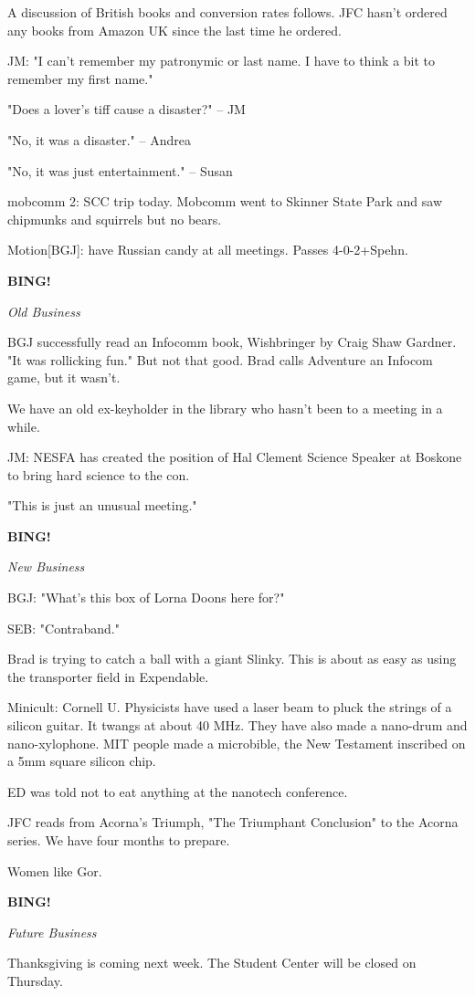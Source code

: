 \documentclass[12pt]{article}
\newcommand{\bing}{{\bf BING!} }
\newcommand{\goto}[1]{\bing \vskip 12pt \centerline{{\em{#1}}}}
\begin{document}
A discussion of British books and conversion rates follows. JFC hasn't ordered any books from Amazon UK since the last time he ordered.

JM: "I can't remember my patronymic or last name. I have to think a bit to remember my first name."

"Does a lover's tiff cause a disaster?" -- JM

"No, it was a disaster." -- Andrea

"No, it was just entertainment." -- Susan

mobcomm 2: SCC trip today. Mobcomm went to Skinner State Park and saw chipmunks and squirrels but no bears.

Motion[BGJ]: have Russian candy at all meetings. Passes 4-0-2+Spehn.

\goto{Old Business}

BGJ successfully read an Infocomm book, Wishbringer by Craig Shaw Gardner. "It was rollicking fun." But not that good. Brad calls Adventure an Infocom game, but it wasn't.

We have an old ex-keyholder in the library who hasn't been to a meeting in a while.

JM: NESFA has created the position of Hal Clement Science Speaker at Boskone to bring hard science to the con.

"This is just an unusual meeting."

\goto{New Business}

BGJ: "What's this box of Lorna Doons here for?"

SEB: "Contraband."

Brad is trying to catch a ball with a giant Slinky. This is about as easy as using the transporter field in Expendable.

Minicult: Cornell U. Physicists have used a laser beam to pluck the strings of a silicon guitar. It twangs at about 40 MHz. They have also made a nano-drum and nano-xylophone. MIT people made a microbible, the New Testament inscribed on a 5mm square silicon chip.

ED was told not to eat anything at the nanotech conference.

JFC reads from Acorna's Triumph, "The Triumphant Conclusion" to the Acorna series. We have four months to prepare.

Women like Gor.

\goto{Future Business}

Thanksgiving is coming next week.  The Student Center will be closed on Thursday.
\end{document}

